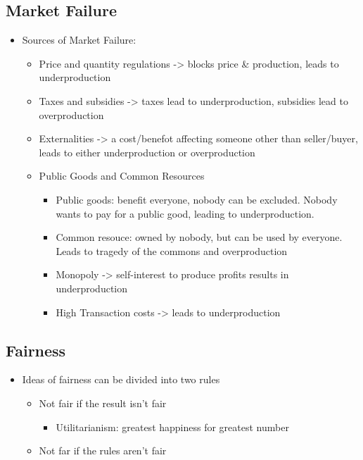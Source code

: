 \documentclass[11pt]{article}
\begin{document}
\subsection{Market Failure}
\label{sec:org940003a}
\begin{itemize}
\item Sources of Market Failure:
\begin{itemize}
\item Price and quantity regulations -> blocks price \& production, leads to underproduction
\item Taxes and subsidies -> taxes lead to underproduction, subsidies lead to overproduction
\item Externalities -> a cost/benefot affecting someone other than seller/buyer, leads to either
underproduction or overproduction
\item Public Goods and Common Resources
\begin{itemize}
\item Public goods: benefit everyone, nobody can be excluded. Nobody wants to pay for a public
good, leading to underproduction.
\item Common resouce: owned by nobody, but can be used by everyone. Leads to tragedy of the commons
and overproduction
\item Monopoly -> self-interest to produce profits results in underproduction
\item High Transaction costs -> leads to underproduction
\end{itemize}
\end{itemize}
\end{itemize}
\subsection{Fairness}
\label{sec:orgdb044d4}
\begin{itemize}
\item Ideas of fairness can be divided into two rules
\begin{itemize}
\item Not fair if the result isn't fair
\begin{itemize}
\item Utilitarianism: greatest happiness for greatest number
\end{itemize}
\item Not far if the rules aren't fair
\end{itemize}
\end{itemize}
\end{document}
